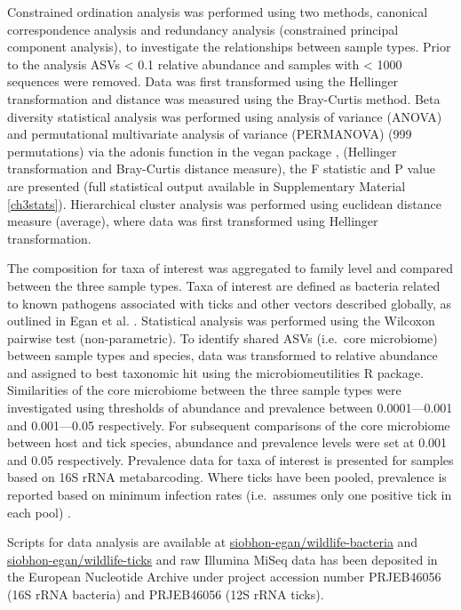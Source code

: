 \documentclass[a4paper, nobind]{templates/ociamthesis}
\begin{document}
Constrained ordination analysis was performed using two methods, canonical correspondence analysis and redundancy analysis (constrained principal component analysis), to investigate the relationships between sample types.
Prior to the analysis ASVs \textless{} 0.1 relative abundance and samples with \textless{} 1000 sequences were removed.
Data was first transformed using the Hellinger transformation and distance was measured using the Bray-Curtis method.
Beta diversity statistical analysis was performed using analysis of variance (ANOVA) and permutational multivariate analysis of variance (PERMANOVA) (999 permutations) via the adonis function in the vegan package \autocite{oksanenVeganCommunityEcology2020}, (Hellinger transformation and Bray-Curtis distance measure), the F statistic and P value are presented (full statistical output available in Supplementary Material \ref{ch3stats}).
Hierarchical cluster analysis was performed using euclidean distance measure (average), where data was first transformed using Hellinger transformation.

The composition for taxa of interest was aggregated to family level and compared between the three sample types.
Taxa of interest are defined as bacteria related to known pathogens associated with ticks and other vectors described globally, as outlined in Egan et al. \autocite*{eganBacterialCommunityProfiling2020}.
Statistical analysis was performed using the Wilcoxon pairwise test (non-parametric).
To identify shared ASVs (i.e.~core microbiome) between sample types and species, data was transformed to relative abundance and assigned to best taxonomic hit using the microbiomeutilities R package.
Similarities of the core microbiome between the three sample types were investigated using thresholds of abundance and prevalence between 0.0001---0.001 and 0.001---0.05 respectively.
For subsequent comparisons of the core microbiome between host and tick species, abundance and prevalence levels were set at 0.001 and 0.05 respectively.
Prevalence data for taxa of interest is presented for samples based on 16S rRNA metabarcoding. Where ticks have been pooled, prevalence is reported based on minimum infection rates (i.e.~assumes only one positive tick in each pool) \autocite{estrada-penaPitfallsTickTickBorne2021}.

Scripts for data analysis are available at \href{https://github.com/siobhon-egan/wildlife-bacteria}{siobhon-egan/wildlife-bacteria} and \href{https://github.com/siobhon-egan/wildlife-ticks}{siobhon-egan/wildlife-ticks} and raw Illumina MiSeq data has been deposited in the European Nucleotide Archive under project accession number PRJEB46056 (16S rRNA bacteria) and PRJEB46056 (12S rRNA ticks).
\end{document}
